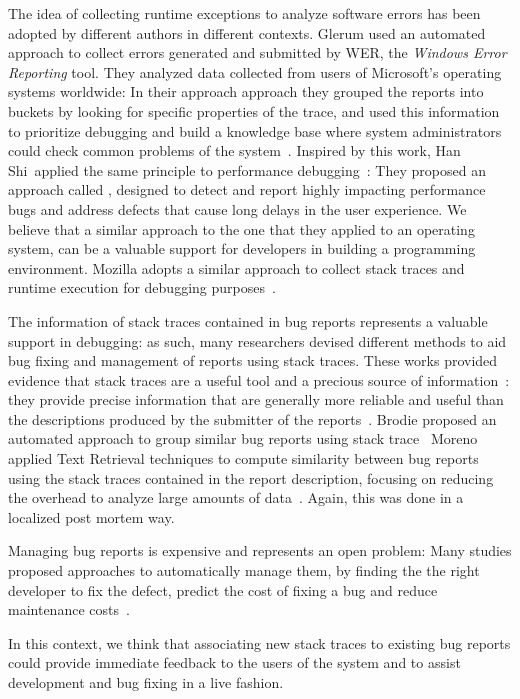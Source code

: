 The idea of collecting runtime exceptions to analyze software errors has been adopted by different authors in different contexts.
Glerum \etal used an automated approach to collect errors generated and submitted by WER, the \emph{Windows Error Reporting} tool.
They analyzed data collected from users of Microsoft's operating systems worldwide: In their approach approach they grouped the reports into buckets by looking for specific properties of the trace, and used this information to prioritize debugging and build a knowledge base where system administrators could check common problems of the system~\cite{Glerum2009}.
Inspired by this work, Han Shi~\etal applied the same principle to performance debugging~\cite{Han2012}: They proposed an approach called , designed to detect and report highly impacting performance bugs and address defects that cause long delays in the user experience.
We believe that a similar approach to the one that they applied to an operating system, can be a valuable support for developers in building a programming environment.
Mozilla adopts a similar approach to collect stack traces and runtime execution for debugging purposes~\cite{McLa2004}.

The information of stack traces contained in bug reports represents a valuable support in debugging: as such, many researchers devised different methods to aid bug fixing and management of reports using stack traces.
These works provided evidence that stack traces are a useful tool and a precious source of information~\cite{Davie2013,Wang2013,Brod2005,Weis2007a}: they provide precise information that are generally more reliable and useful than the descriptions produced by the submitter of the reports~\cite{Ko2006}.
Brodie \etal proposed an automated approach to group similar bug reports using stack trace~\cite{Brod2005}
Moreno \etal applied Text Retrieval techniques to compute similarity between bug reports using the stack traces contained in the report description, focusing on reducing the overhead to analyze large amounts of data~\cite{Moreno2014}.
Again, this was done in a localized post mortem way.

Managing bug reports is expensive and represents an open problem: Many studies proposed approaches to automatically manage them, by finding the the right developer to fix the defect, predict the cost of fixing a bug and reduce maintenance costs~\cite{Matt2009,Anvi2006a,Sliw2005,DAmb2010c}.

In this context, we think that associating new stack traces to existing bug reports could provide immediate feedback to the users of the system and to assist development and bug fixing in a live fashion.



